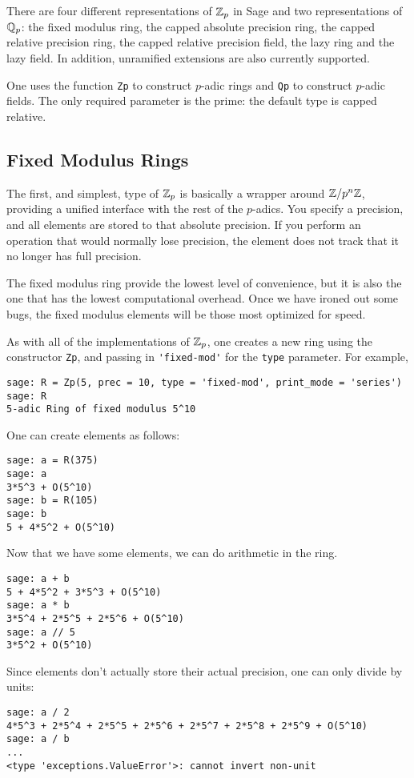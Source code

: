 \documentclass[12pt]{article}
\begin{document}
There are four different representations of $\mathbb{Z}_p$ in Sage and two representations of $\mathbb{Q}_p$:
the fixed modulus ring, the capped absolute precision ring, the capped relative precision
ring, the capped relative precision field, the lazy ring and the lazy field.  In addition,
unramified extensions are also currently supported.

One uses the function \verb/Zp/ to construct $p$-adic rings and \verb/Qp/ to construct $p$-adic
fields.  The only required parameter is the prime: the default type is capped relative.

\subsection{Fixed Modulus Rings}
The first, and simplest, type of $\mathbb{Z}_p$ is basically a wrapper around $\mathbb{Z} / p^n\mathbb{Z}$, providing a
unified interface with the rest of the $p$-adics.  You specify a precision, and all elements
are stored to that absolute precision.  If you perform an operation that would normally lose
precision, the element does not track that it no longer has full precision.

The fixed modulus ring provide the lowest level of convenience, but it is also the one that
has the lowest computational overhead.  Once we have ironed out some bugs, the fixed modulus
elements will be those most optimized for speed.

As with all of the implementations of $\mathbb{Z}_p$, one creates a new ring using the constructor
\verb/Zp/, and passing in \verb/'fixed-mod'/ for the \verb/type/ parameter.  For example,
\begin{verbatim}
sage: R = Zp(5, prec = 10, type = 'fixed-mod', print_mode = 'series')
sage: R
5-adic Ring of fixed modulus 5^10
\end{verbatim}

One can create elements as follows:
\begin{verbatim}
sage: a = R(375)
sage: a
3*5^3 + O(5^10)
sage: b = R(105)
sage: b
5 + 4*5^2 + O(5^10)
\end{verbatim}

Now that we have some elements, we can do arithmetic in the ring.
\begin{verbatim}
sage: a + b
5 + 4*5^2 + 3*5^3 + O(5^10)
sage: a * b
3*5^4 + 2*5^5 + 2*5^6 + O(5^10)
sage: a // 5
3*5^2 + O(5^10)
\end{verbatim}

Since elements don't actually store their actual precision, one can only divide by units:
\begin{verbatim}
sage: a / 2
4*5^3 + 2*5^4 + 2*5^5 + 2*5^6 + 2*5^7 + 2*5^8 + 2*5^9 + O(5^10)
sage: a / b
...
<type 'exceptions.ValueError'>: cannot invert non-unit
\end{verbatim}
\end{document}
